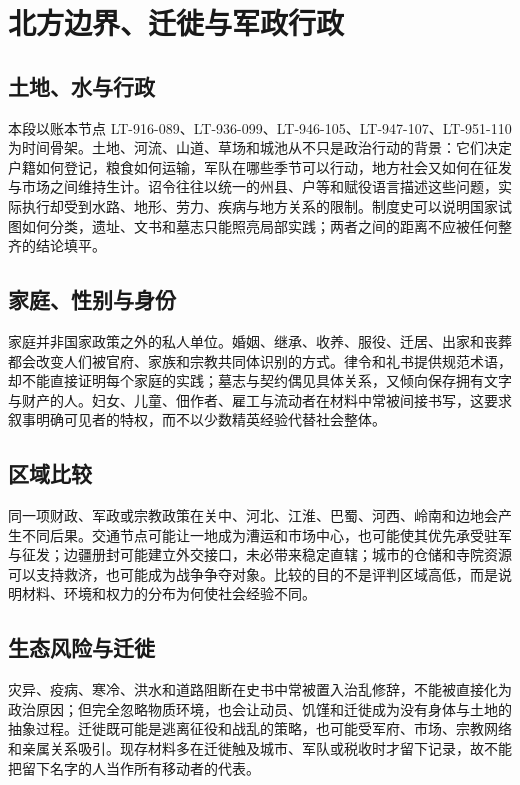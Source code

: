 \section{北方边界、迁徙与军政行政}
\label{sec:northern-border-migration-administration}

\subsection{土地、水与行政}
本段以账本节点 LT-916-089、LT-936-099、LT-946-105、LT-947-107、LT-951-110 为时间骨架。土地、河流、山道、草场和城池从不只是政治行动的背景：它们决定户籍如何登记，粮食如何运输，军队在哪些季节可以行动，地方社会又如何在征发与市场之间维持生计。诏令往往以统一的州县、户等和赋役语言描述这些问题，实际执行却受到水路、地形、劳力、疾病与地方关系的限制。制度史可以说明国家试图如何分类，遗址、文书和墓志只能照亮局部实践；两者之间的距离不应被任何整齐的结论填平。

\subsection{家庭、性别与身份}
家庭并非国家政策之外的私人单位。婚姻、继承、收养、服役、迁居、出家和丧葬都会改变人们被官府、家族和宗教共同体识别的方式。律令和礼书提供规范术语，却不能直接证明每个家庭的实践；墓志与契约偶见具体关系，又倾向保存拥有文字与财产的人。妇女、儿童、佃作者、雇工与流动者在材料中常被间接书写，这要求叙事明确可见者的特权，而不以少数精英经验代替社会整体。

\subsection{区域比较}
同一项财政、军政或宗教政策在关中、河北、江淮、巴蜀、河西、岭南和边地会产生不同后果。交通节点可能让一地成为漕运和市场中心，也可能使其优先承受驻军与征发；边疆册封可能建立外交接口，未必带来稳定直辖；城市的仓储和寺院资源可以支持救济，也可能成为战争争夺对象。比较的目的不是评判区域高低，而是说明材料、环境和权力的分布为何使社会经验不同。

\subsection{生态风险与迁徙}
灾异、疫病、寒冷、洪水和道路阻断在史书中常被置入治乱修辞，不能被直接化为政治原因；但完全忽略物质环境，也会让动员、饥馑和迁徙成为没有身体与土地的抽象过程。迁徙既可能是逃离征役和战乱的策略，也可能受军府、市场、宗教网络和亲属关系吸引。现存材料多在迁徙触及城市、军队或税收时才留下记录，故不能把留下名字的人当作所有移动者的代表。

